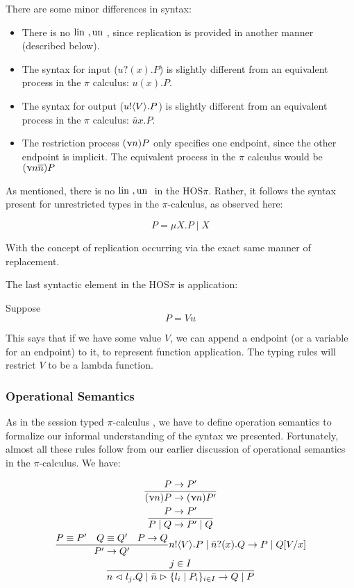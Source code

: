 There are some minor differences in syntax:
\begin{itemize}
    \item There is no $\text{lin }, \text{un }$, since replication is provided in another manner (described below).
    \item The syntax for input ($u ? (x) . P$) is slightly different from an equivalent process in the $\pi$ calculus: $u(x) . P$.
    \item The syntax for output ($u! \langle V \rangle.P$) is slightly different from an equivalent process in the $\pi$ calculus: $\bar{u}x.P$.
    \item The restriction process $(\upnu n) P$ only specifies one endpoint, since the other endpoint is implicit. The equivalent process in the $\pi$ calculus would be $(\upnu n \overline{n}) P$
\end{itemize}


As mentioned, there is no $\text{lin }, \text{un }$ in the HOS$\pi$. Rather, it follows the syntax present for unrestricted types in the $\pi$-calculus, as observed here:

$$
P = \mu X . P \mid X
$$

With the concept of replication occurring via the exact same manner of replacement.

The last syntactic element in the HOS$\pi$ is application:


Suppose
$$
P = V u
$$

This says that if we have some value $V$, we can append a endpoint (or a variable for an endpoint) to it, to represent function application. The typing rules will restrict $V$ to be a lambda function.



\subsubsection{Operational Semantics}

As in the session typed $\pi$-calculus , we have to define operation semantics to formalize our informal understanding of the syntax we presented. Fortunately, almost all these rules follow from our earlier discussion of operational semantics in the $\pi$-calculus. We have:

\begin{gather*}
\frac{P \rightarrow P'}{(\upnu n)P \rightarrow (\upnu n)P'} \\
\frac{P \rightarrow P'}{P \mid Q \rightarrow P' \mid Q} \\
\frac{P \equiv P' \quad Q \equiv Q' \quad P \rightarrow Q}{P' \rightarrow Q'}
n!\langle V \rangle . P \mid \bar{n}?(x).Q \rightarrow P \mid Q[V / x] \\
\frac{j \in I}{n \vartriangleleft l_j .Q \mid \bar{n} \vartriangleright \{l_i \mid P_i\}_{i \in I} \rightarrow Q \mid P}
\end{gather*}

